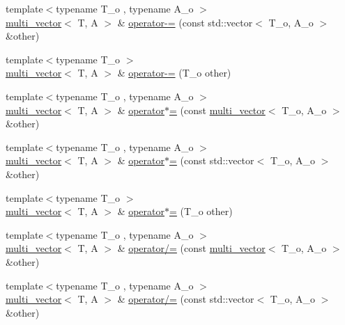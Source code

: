 \begin{DoxyCompactItemize}
\item 
{\footnotesize template$<$typename T\+\_\+o , typename A\+\_\+o $>$ }\\\hyperlink{classIceBRG_1_1multi__vector}{multi\+\_\+vector}$<$ T, A $>$ \& \hyperlink{classIceBRG_1_1multi__vector_ad2805cc6dfd1d7e5a6c3ddccf8e05217}{operator-\/=} (const std\+::vector$<$ T\+\_\+o, A\+\_\+o $>$ \&other)
\item 
{\footnotesize template$<$typename T\+\_\+o $>$ }\\\hyperlink{classIceBRG_1_1multi__vector}{multi\+\_\+vector}$<$ T, A $>$ \& \hyperlink{classIceBRG_1_1multi__vector_aff6dc155260c3184e867fd791f90f4b2}{operator-\/=} (T\+\_\+o other)
\item 
{\footnotesize template$<$typename T\+\_\+o , typename A\+\_\+o $>$ }\\\hyperlink{classIceBRG_1_1multi__vector}{multi\+\_\+vector}$<$ T, A $>$ \& \hyperlink{classIceBRG_1_1multi__vector_a73496e141636d17cb8518bf9349bcc61}{operator$\ast$=} (const \hyperlink{classIceBRG_1_1multi__vector}{multi\+\_\+vector}$<$ T\+\_\+o, A\+\_\+o $>$ \&other)
\item 
{\footnotesize template$<$typename T\+\_\+o , typename A\+\_\+o $>$ }\\\hyperlink{classIceBRG_1_1multi__vector}{multi\+\_\+vector}$<$ T, A $>$ \& \hyperlink{classIceBRG_1_1multi__vector_ae18d0d68a054316add7134b34364504e}{operator$\ast$=} (const std\+::vector$<$ T\+\_\+o, A\+\_\+o $>$ \&other)
\item 
{\footnotesize template$<$typename T\+\_\+o $>$ }\\\hyperlink{classIceBRG_1_1multi__vector}{multi\+\_\+vector}$<$ T, A $>$ \& \hyperlink{classIceBRG_1_1multi__vector_a828d13398771ee0cb3618aa72023c414}{operator$\ast$=} (T\+\_\+o other)
\item 
{\footnotesize template$<$typename T\+\_\+o , typename A\+\_\+o $>$ }\\\hyperlink{classIceBRG_1_1multi__vector}{multi\+\_\+vector}$<$ T, A $>$ \& \hyperlink{classIceBRG_1_1multi__vector_ae6912cd1b408b33e4f6e616b394f6375}{operator/=} (const \hyperlink{classIceBRG_1_1multi__vector}{multi\+\_\+vector}$<$ T\+\_\+o, A\+\_\+o $>$ \&other)
\item 
{\footnotesize template$<$typename T\+\_\+o , typename A\+\_\+o $>$ }\\\hyperlink{classIceBRG_1_1multi__vector}{multi\+\_\+vector}$<$ T, A $>$ \& \hyperlink{classIceBRG_1_1multi__vector_aea2029e62a8c71e4ce078002bbcf5a01}{operator/=} (const std\+::vector$<$ T\+\_\+o, A\+\_\+o $>$ \&other)

\end{DoxyCompactItemize}
